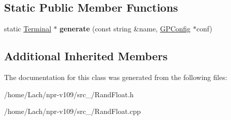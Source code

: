 \subsection*{Static Public Member Functions}
\begin{DoxyCompactItemize}
\item 
\hypertarget{classRandFloat_a8ab1360b98f5c6cdeec81de6910b9004}{}\label{classRandFloat_a8ab1360b98f5c6cdeec81de6910b9004} 
static \hyperlink{classTerminal}{Terminal} $\ast$ {\bfseries generate} (const string \&name, \hyperlink{classGPConfig}{G\+P\+Config} $\ast$conf)
\end{DoxyCompactItemize}
\subsection*{Additional Inherited Members}


The documentation for this class was generated from the following files\+:\begin{DoxyCompactItemize}
\item 
/home/\+Lach/npr-\/v109/src\+\_/Rand\+Float.\+h\item 
/home/\+Lach/npr-\/v109/src\+\_/Rand\+Float.\+cpp\end{DoxyCompactItemize}
